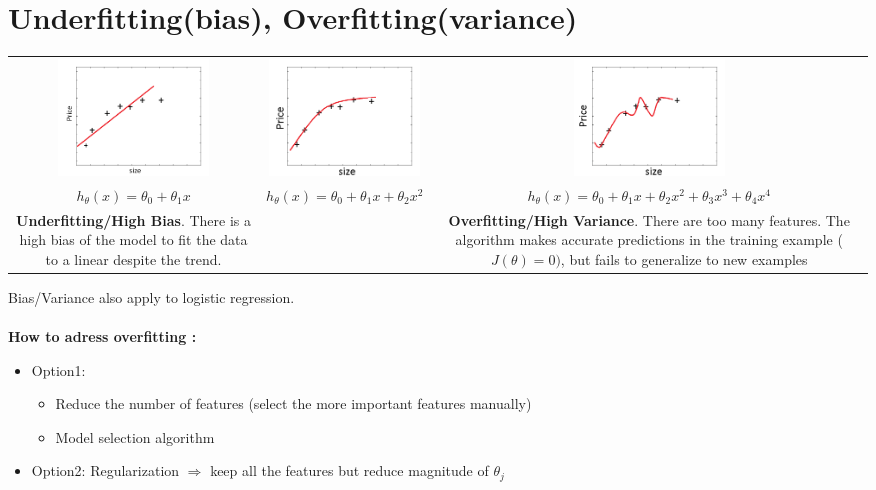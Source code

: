 \documentclass[a4paper,12pt]{report}
\begin{document}
\section{Underfitting(bias), Overfitting(variance)}
\begin{table}[h]
\centering
\begin{tabular}{ccc}
 \includegraphics[width=4cm]{underfitting.png} & \includegraphics[width=4cm]{goodfitting.png} & \includegraphics[width=4cm]{overfitting.png} \\
\tiny{$h_{\theta}(x) = \theta_0 + \theta_1 x$} & \tiny{$h_{\theta}(x) = \theta_0 + \theta_1 x + \theta_2  x^2$} & \tiny{$h_{\theta}(x) = \theta_0 + \theta_1 x + \theta_2  x^2 + \theta_3 x^3 + \theta_4 x^4$} \\
\parbox{4cm}{\tiny \textbf{Underfitting/High Bias}. There is a high bias of the model to fit the data to a linear despite the trend.} & &\parbox{4cm}{\tiny \textbf{Overfitting/High Variance}. There are too many features. The algorithm makes accurate predictions in the training example ($J(\theta)=0)$, but fails to generalize to new examples}
\end{tabular}
\end{table}

Bias/Variance also apply to logistic regression. \\ \\

\textbf{How to adress overfitting :}
\begin{itemize}
	\item Option1: 
	\begin{itemize}
		\item Reduce the number of features (select the more important features manually)
		\item Model selection algorithm
	\end{itemize}
	
	\item Option2: Regularization $\Rightarrow $ keep all the features but reduce magnitude of $\theta_j$
\end{itemize}
\end{document}
